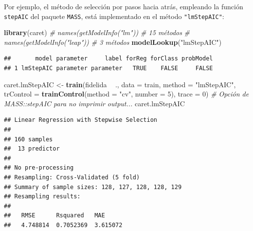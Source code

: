 \documentclass[
]{book}
\newenvironment{Shaded}{\begin{snugshade}}{\end{snugshade}}
\newcommand{\CommentTok}[1]{\textcolor[rgb]{0.56,0.35,0.01}{\textit{#1}}}
\newcommand{\DataTypeTok}[1]{\textcolor[rgb]{0.13,0.29,0.53}{#1}}
\newcommand{\DecValTok}[1]{\textcolor[rgb]{0.00,0.00,0.81}{#1}}
\newcommand{\KeywordTok}[1]{\textcolor[rgb]{0.13,0.29,0.53}{\textbf{#1}}}
\newcommand{\NormalTok}[1]{#1}
\newcommand{\OperatorTok}[1]{\textcolor[rgb]{0.81,0.36,0.00}{\textbf{#1}}}
\newcommand{\StringTok}[1]{\textcolor[rgb]{0.31,0.60,0.02}{#1}}
\theoremstyle{break}
\theoremstyle{definition}
\theoremstyle{definition}
\theoremstyle{definition}
\theoremstyle{remark}
\begin{document}
Por ejemplo, el método de selección por pasos hacia atrás, empleando la función \texttt{stepAIC} del paquete \texttt{MASS}, está implementado en el método \texttt{"lmStepAIC"}:

\begin{Shaded}
\begin{Highlighting}[]
\KeywordTok{library}\NormalTok{(caret)}
\CommentTok{# names(getModelInfo("lm")) # 15 métodos}
\CommentTok{# names(getModelInfo("leap")) # 3 métodos}
\KeywordTok{modelLookup}\NormalTok{(}\StringTok{"lmStepAIC"}\NormalTok{) }
\end{Highlighting}
\end{Shaded}

\begin{verbatim}
##       model parameter     label forReg forClass probModel
## 1 lmStepAIC parameter parameter   TRUE    FALSE     FALSE
\end{verbatim}

\begin{Shaded}
\begin{Highlighting}[]
\NormalTok{caret.lmStepAIC <-}\StringTok{ }\KeywordTok{train}\NormalTok{(fidelida }\OperatorTok{~}\StringTok{ }\NormalTok{., }\DataTypeTok{data =}\NormalTok{ train, }\DataTypeTok{method =} \StringTok{"lmStepAIC"}\NormalTok{,}
                   \DataTypeTok{trControl =} \KeywordTok{trainControl}\NormalTok{(}\DataTypeTok{method =} \StringTok{"cv"}\NormalTok{, }\DataTypeTok{number =} \DecValTok{5}\NormalTok{),}
                   \DataTypeTok{trace =} \DecValTok{0}\NormalTok{) }\CommentTok{# Opción de MASS::stepAIC para no imprimir output...}
\NormalTok{caret.lmStepAIC}
\end{Highlighting}
\end{Shaded}

\begin{verbatim}
## Linear Regression with Stepwise Selection 
## 
## 160 samples
##  13 predictor
## 
## No pre-processing
## Resampling: Cross-Validated (5 fold) 
## Summary of sample sizes: 128, 127, 128, 128, 129 
## Resampling results:
## 
##   RMSE      Rsquared   MAE     
##   4.748814  0.7052369  3.615072
\end{verbatim}

\begin{Shaded}
\end{Shaded}
\end{document}
